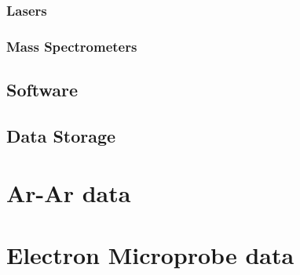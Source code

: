 \documentclass[12pt]{report}
\begin{document}
\subsection{Lasers}
\subsection{Mass Spectrometers}
\section{Software}
\section{Data Storage}

\appendix
\chapter{Ar-Ar data}
\chapter{Electron Microprobe data}



\nocite{*} %

% 
%
%
%
\begin{References}[99]
%
%


\end{References}
\copyrightpage
\end{document}
